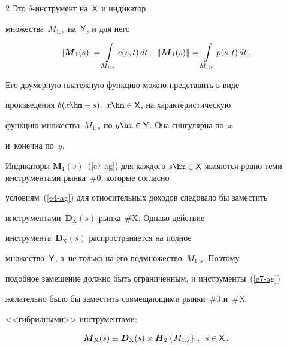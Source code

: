 \begin{multicols}{2}
    Это $\delta$-ин\-стру\-мент на~${\sf X}$ и индикатор 


множества~$M_{1;s}$ на~${\sf Y}$, и для него 


  $$


  \left\vert \boldsymbol{M}_1(s)\right\vert =\int\limits_{M_{1;s}} 


c(s,t)\,dt\,;\enskip


  \left\| \boldsymbol{M}_1(s)\right\| =\int\limits_{M_{1;s}} p(s,t)\,dt\,.


  $$


  


  Его двумерную платежную функцию можно представить в виде 


произведения $\delta(x \hm- s)$, $x \hm\in {\sf X}$, на характеристическую 


функцию множества~$M_{1;s}$ по $y \hm\in {\sf  Y}$. Она сингулярна по~$x$ 


и~конечна по~$y$. 


  


  Индикаторы $\boldsymbol{M}_1(s)$~(\ref{e7-ag}) для каждого  $s \hm \in   


{\sf  X}$ являются ровно теми инструментами рынка~\#0, которые согласно 


условиям~(\ref{e4-ag}) для относительных доходов следовало бы заместить 


инструментами~$\boldsymbol{D}_{\mathrm{X}}(s)$ рынка~\#X. Однако действие 


инструмента~$\boldsymbol{D}_{\mathrm{X}}(s)$ распространяется на полное 


множество~${\sf Y}$, а~не только на его подмножество~$M_{1;s}$. Поэтому 


подобное замещение должно быть ограниченным, и инструменты~(\ref{e7-ag}) 


желательно было бы заместить совмещающими рынки~\#0 и~\#X 


<<гибридными>> инструментами: 


  \begin{equation}


  \boldsymbol{M}_{\mathrm{X}}(s)\equiv 


\boldsymbol{D}_{\mathrm{X}}(s)\times \boldsymbol{H}_2\left\{ 


M_{1;s}\right\}\,,\enskip s\in {\sf X}\,.


  \label{e8-ag}


  \end{equation}



\end{multicols}
